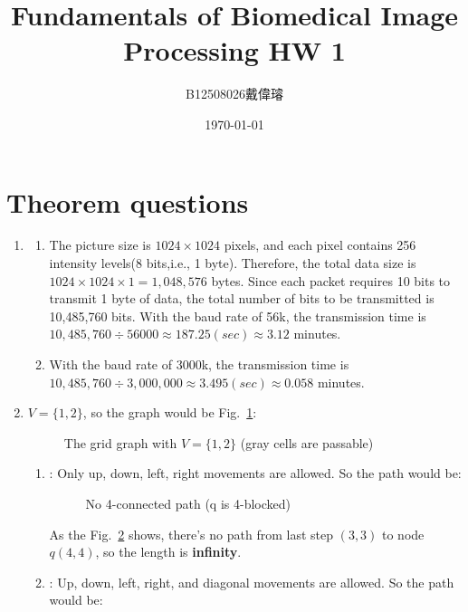 \documentclass[12pt,a4paper]{article}
\title{Fundamentals of Biomedical Image Processing HW 1}
\author{B12508026戴偉璿}
\date{\today}
\begin{document}
\maketitle
{}

\section{Theorem questions}
\begin{enumerate}
    \item
    \begin{enumerate}
        \item The picture size is $1024\times 1024$ pixels, and each pixel contains 256 intensity levels(8 bits,i.e., 1 byte). Therefore, the total data size is $1024\times 1024 \times 1 = 1,048,576$ bytes. Since each packet requires 10 bits to transmit 1 byte of data, the total number of bits to be transmitted is 10,485,760 bits. With the baud rate of 56k, the transmission time is $10,485,760\div 56000 \approx 187.25(sec)\approx 3.12$ minutes.
        \item With the baud rate of 3000k, the transmission time is\\ $10,485,760\div 3,000,000 \approx 3.495(sec)\approx 0.058$ minutes.
    \end{enumerate}
    \item $V=\{1 ,2\}$, so the graph would be Fig.~\ref{fig:2a}:
    \begin{figure}[H]
        \centering
        
        \caption{The grid graph with $V=\{1,2\}$ (gray cells are passable)}
        \label{fig:2a}
    \end{figure}
    \newpage
    \begin{enumerate}
        \item {}: Only up, down, left, right movements are allowed. So the path would be:
        \begin{figure}[H]
            \centering
            
            \caption{No 4-connected path (q is 4-blocked)}
            \label{fig:2a_s4}
        \end{figure}
        As the Fig.~\ref{fig:2a_s4} shows, there's no path from last step $(3, 3)$ to node $q(4, 4)$, so the length is \textbf{infinity}.
        \item {}: Up, down, left, right, and diagonal movements are allowed. So the path would be:
        \begin{figure}[H]

\end{figure}
\end{enumerate}
\end{enumerate}
\end{document}
